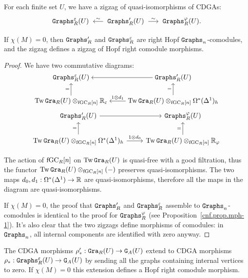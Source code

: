 \begin{proposition}
  \label{cnf.prop.zig-gra-e-phi}
  For each finite set $U$, we have a zigzag of quasi-isomorphisms of CDGAs:
  \[ \Graphs^{\varepsilon}_{R}(U) \qiso* \Graphs'_{R}(U) \qiso \Graphs^{\varphi}_{R}(U). \]

  If $\chi(M) = 0$, then $\mathtt{Graphs}'_{R}$ and $\mathtt{Graphs}^{\varepsilon}_{R}$ are right Hopf $\mathtt{Graphs}_{n}$-comodules, and the zigzag defines a zigzag of Hopf right comodule morphisms.
\end{proposition}

\begin{proof}
  We have two commutative diagrams:
  \[ \begin{tikzcd}[cramped]
      \Graphs^{\varepsilon}_{R}(U) & \Graphs'_{R}(U) \lar{} \\
      \Tw\Gra_{R}(U) \otimes_{\fGC_{R}[n]} \R_{\varepsilon} \uar{=}
      & \Tw\Gra_{R}(U) \otimes_{\fGC_{R}[n]} \Omega^{*}(\Delta^{1})_{h} \uar{=} \lar[swap]{1 \otimes d_{1}}
    \end{tikzcd} \]
\[ \begin{tikzcd}
    \Graphs'_{R}(U) \rar{} & \Graphs^{\varphi}_{R}(U) \\
    \Tw\Gra_{R}(U) \otimes_{\fGC_{R}[n]} \Omega^{*}(\Delta^{1})_{h} \uar{=} \rar{1 \otimes d_{0}}
      & \Tw\Gra_{R}(U) \otimes_{\fGC_{R}[n]} \R_{\varphi} \uar{=}    
  \end{tikzcd} \]

  The action of $\mathrm{fGC}_{R}[n]$ on $\operatorname{Tw}\mathtt{Gra}_{R}(U)$ is quasi-free with a good filtration, thus the functor $\operatorname{Tw} \mathtt{Gra}_{R}(U) \otimes_{\mathrm{fGC}_{R}[n]} (-)$ preserves quasi-isomorphisms.
  The two maps $d_{0}, d_{1} : \Omega^{*}(\Delta^{1}) \to \mathbb{R}$ are quasi-isomorphisms, therefore all the maps in the diagram are quasi-isomorphisms.

  If $\chi(M) = 0$, the proof that $\mathtt{Graphs}'_{R}$ and $\mathtt{Graphs}^{\varepsilon}_{R}$ assemble to $\mathtt{Graphs}_{n}$-co\-mo\-dules is identical to the proof for $\mathtt{Graphs}^{\varphi}_{R}$ (see Proposition~\ref{cnf.prop.mph-1}).
  It's also clear that the two zigzags define morphisms of comodules: in $\mathtt{Graphs}_{n}$, all internal components are identified with zero anyway.
\end{proof}

\begin{proposition}
  \label{cnf.prop.mph-2}
  The CDGA morphisms $\rho'_{*} : \mathtt{Gra}_{R}(U) \to \mathtt{G}_{A}(U)$ extend to CDGA morphisms $\rho_{*} : \mathtt{Graphs}^{\varepsilon}_{R}(U) \to \mathtt{G}_{A}(U)$ by sending all the graphs containing internal vertices to zero.
  If $\chi(M) = 0$ this extension defines a Hopf right comodule morphism.
\end{proposition}

